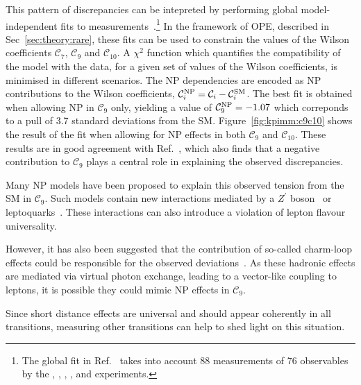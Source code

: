 This pattern of discrepancies can be intepreted by performing global model-independent fits to \btosmm measurements~\cite{Altmannshofer:2015sma}.{\footnote{The global fit in Ref.~\cite{Altmannshofer:2015sma} takes into account 88 measurements of 76 observables by the \atlas, \babar, \belle, \cdf, \cms and \lhcb experiments.}} In the framework of OPE, described in Sec~\ref{sec:theory:rare}, these fits can be used to constrain the values of the Wilson coefficients $\mathcal{C}_{7}$, $\mathcal{C}_{9}$ and $\mathcal{C}_{10}$. A $\chi^{2}$ function which quantifies the compatibility of the model with the data, for a given set of values of the Wilson coefficients, is minimised in different scenarios. The NP dependencies are encoded as NP contributions to the Wilson coefficients, $\mathcal{C}_{i}^{\rm NP} = \mathcal{C}_{i}-\mathcal{C}_{i}^{\rm SM}$. The best fit is obtained when allowing NP in $\mathcal{C}_{9}$ only, yielding a value of $\mathcal{C}_{9}^{\rm NP} = -1.07$ which correponds to a pull of 3.7 standard deviations from the SM. Figure~\ref{fig:kpimm:c9c10} shows the result of the fit when allowing for NP effects in both $\mathcal{C}_{9}$ and $\mathcal{C}_{10}$. These results are in good agreement with Ref.~\cite{Descotes-Genon:2015uva}, which also finds that a negative contribution to $\mathcal{C}_{9}$ plays a central role in explaining the observed discrepancies.

Many NP models have been proposed to explain this observed tension from the SM in $\mathcal{C}_{9}$. Such models contain new interactions mediated by a $Z^{'}$ boson~\cite{Gauld:2013qja,Altmannshofer:2014cfa,Crivellin:2015mga} or leptoquarks~\cite{Sahoo:2015wya,Biswas:2014gga,Hiller:2014ula}. These interactions can also introduce a violation of lepton flavour universality.

However, it has also been suggested that the contribution of so-called charm-loop effects could be responsible for the observed deviations~\cite{Lyon:2014hpa}. As these hadronic effects are mediated via virtual photon exchange, leading to a vector-like coupling to leptons, it is possible they could mimic NP effects in $\mathcal{C}_{9}$.

Since short distance effects are universal and should appear coherently in all \btosmm transitions, measuring other \btosmm transitions can help to shed light on this situation.


